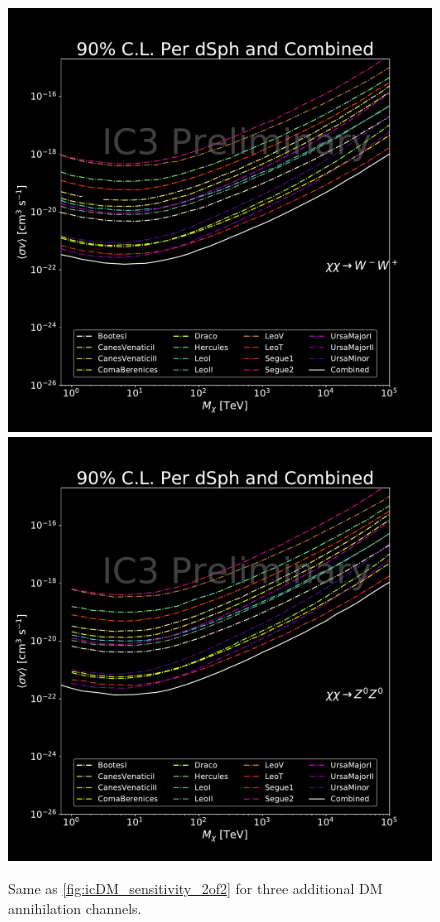 \begin{figure}
{        \includegraphics[scale=0.265]{figures/ic_DM/dm_plots/WW_money_plot_comb.pdf}
        \includegraphics[scale=0.265]{figures/ic_DM/dm_plots/ZZ_money_plot_comb.pdf}
    }
    \caption{Same as \cref{fig:icDM_sensitivity_2of2} for three additional DM annihilation channels.}
    \label{fig:icDM_sensitivity_1of2}
\end{figure}



